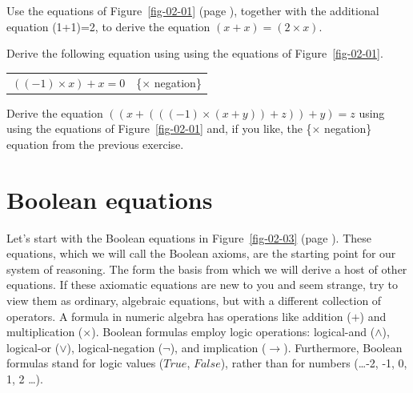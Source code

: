 \begin{ExerciseList}
\label{ex:ch02-intro}
\Exercise
Use the equations of Figure~\ref{fig-02-01} (page \pageref{fig-02-01}),
together with the additional equation (1+1)=2, to derive the equation $(x + x) = (2 \times x)$.

\Exercise
Derive the following equation
using using the equations of Figure~\ref{fig-02-01}.
\begin{center}
\begin{tabular}{ll}
$((-1) \times x) + x = 0$    & \{$\times$ negation\}
\end{tabular}
\end{center}

\Exercise
Derive the equation $((x + (((-1) \times (x + y)) + z)) + y) = z$
using using the equations of Figure~\ref{fig-02-01} and,
if you like,
the \{$\times$ negation\} equation from the previous exercise.
\end{ExerciseList}

\section{Boolean equations}
\label{sec:boolean-equations}
Let's start with the Boolean equations in
Figure~\ref{fig-02-03} (page \pageref{fig-02-03}).
These equations, which we will call the Boolean axioms,
are the starting point for our system of reasoning.
The form the basis from which we will derive
a host of other equations.
If these axiomatic equations are new to you and seem strange,
try to view them as ordinary,
algebraic equations, but with a different collection of operators.
A formula in numeric algebra has operations like addition
($+$) and multiplication ($\times$). Boolean formulas employ logic
operations: logical-and ($\wedge$), logical-or ($\vee$),
logical-negation ($\neg$), and implication ($\rightarrow$).
Furthermore, Boolean formulas stand for logic values
($True$, $False$), rather than for numbers (\dots -2, -1, 0, 1, 2 \dots).

